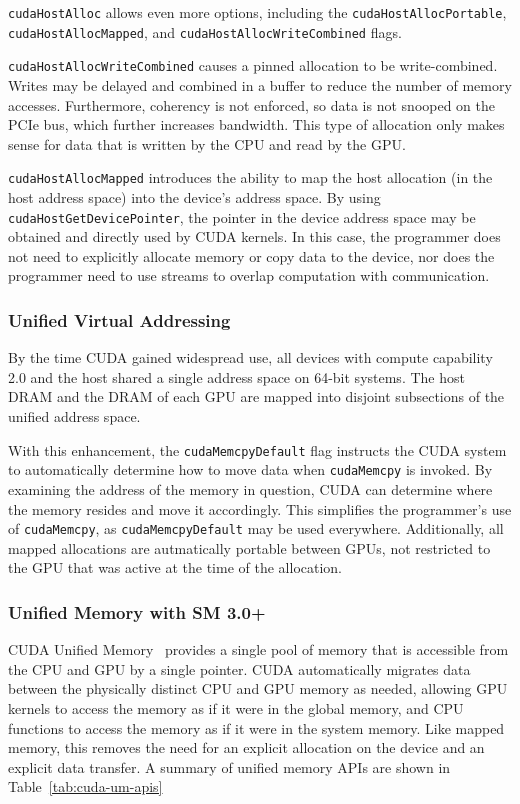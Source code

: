 \texttt{cudaHostAlloc} allows even more options, including the \texttt{cudaHostAllocPortable}, \texttt{cudaHostAllocMapped}, and \texttt{cudaHostAllocWriteCombined} flags.

\texttt{cudaHostAllocWriteCombined} causes a pinned allocation to be write-combined.
Writes may be delayed and combined in a buffer to reduce the number of memory accesses.
Furthermore, coherency is not enforced, so data is not snooped on the PCIe bus, which further increases bandwidth.
This type of allocation only makes sense for data that is written by the CPU and read by the GPU.


\texttt{cudaHostAllocMapped} introduces the ability to map the host allocation (in the host address space) into the device's address space.
By using \texttt{cudaHostGetDevicePointer}, the pointer in the device address space may be obtained and directly used by CUDA kernels.
In this case, the programmer does not need to explicitly allocate memory or copy data to the device, nor does the programmer need to use streams to overlap computation with communication.

\subsubsection{Unified Virtual Addressing}

By the time CUDA gained widespread use, all devices with compute capability 2.0 and the host shared a single address space on 64-bit systems.
The host DRAM and the DRAM of each GPU are mapped into disjoint subsections of the unified address space.

With this enhancement, the \texttt{cudaMemcpyDefault} flag instructs the CUDA system to automatically determine how to move data when \texttt{cudaMemcpy} is invoked.
By examining the address of the memory in question, CUDA can determine where the memory resides and move it accordingly.
This simplifies the programmer's use of \texttt{cudaMemcpy}, as \texttt{cudaMemcpyDefault} may be used everywhere.
Additionally, all mapped allocations are autmatically portable between GPUs, not restricted to the GPU that was active at the time of the allocation.

\subsubsection{Unified Memory with SM 3.0+}

CUDA Unified Memory~\cite{harris2013cudaunifiedmemory} provides a single pool of memory that is accessible from the CPU and GPU by a single pointer.
CUDA automatically migrates data between the physically distinct CPU and GPU memory as needed, allowing GPU kernels to access the memory as if it were in the global memory, and CPU functions to access the memory as if it were in the system memory.
Like mapped memory, this removes the need for an explicit allocation on the device and an explicit data transfer.
A summary of unified memory APIs are shown in Table~\ref{tab:cuda-um-apis}

